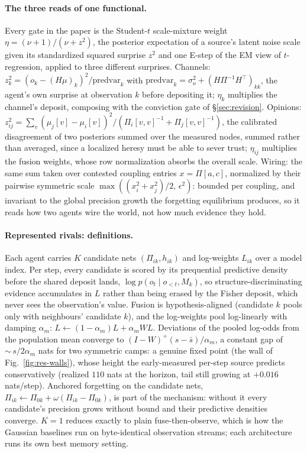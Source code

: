 \documentclass[runningheads]{llncs}
\begin{document}
\paragraph{The three reads of one functional.}
Every gate in the paper is the Student-$t$ scale-mixture weight
$\eta=(\nu+1)/(\nu+z^2)$, the posterior expectation of a source's latent noise scale given
its standardized squared surprise $z^2$ and one E-step of the EM view of $t$-regression, applied
to three different surprises. Channels: $z_k^2=(o_k-(H\mu)_k)^2/\mathrm{predvar}_k$ with
$\mathrm{predvar}_k=\sigma_o^2+(H\Pi^{-1}H^{\!\top})_{kk}$, the agent's own surprise at
observation $k$ before depositing it; $\eta_k$ multiplies the channel's deposit, composing
with the conviction gate of \S\ref{sec:revision}. Opinions:
$z_{ij}^2=\sum_v(\mu_j[v]-\mu_i[v])^2/(\Pi_i[v,v]^{-1}+\Pi_j[v,v]^{-1})$, the calibrated
disagreement of two posteriors summed over the measured nodes, summed rather than averaged,
since a localized heresy must be able to sever trust; $\eta_{ij}$ multiplies the fusion weights, whose row
normalization absorbs the overall scale. Wiring: the same sum taken over contested
coupling entries $x=\Pi[a,c]$, normalized by their pairwise symmetric scale
$\max((x_i^2+x_j^2)/2,\,\epsilon^2)$: bounded per coupling, and invariant to the global
precision growth the forgetting equilibrium produces, so it reads how two agents wire
the world, not how much evidence they hold.

\paragraph{Represented rivals: definitions.}
Each agent carries $K$ candidate nets $(\Pi_{ik},h_{ik})$ and log-weights $L_{ik}$ over a
model index. Per step, every candidate is scored by its prequential predictive density
before the shared deposit lands, $\log p(o_t\mid o_{<t},M_k)$, so
structure-discriminating evidence accumulates in $L$ rather than being erased by the Fisher
deposit, which never sees the observation's value. Fusion is hypothesis-aligned (candidate
$k$ pools only with neighbours' candidate $k$), and the log-weights pool log-linearly with
damping $\alpha_m$: $L\leftarrow(1-\alpha_m)L+\alpha_m WL$. Deviations of the pooled log-odds
from the population mean converge to $(I-W)^{+}(s-\bar s)/\alpha_m$, a constant gap of
${\sim}\,s/2\alpha_m$ nats for two symmetric camps: a genuine fixed point (the wall of
Fig.~\ref{fig:res-walls}), whose height the early-measured per-step source predicts
conservatively (realized $110$ nats at the horizon, tail still growing at $+0.016$ nats/step).
Anchored forgetting on the candidate nets,
$\Pi_{ik}\leftarrow\Pi_{0k}+\omega(\Pi_{ik}-\Pi_{0k})$, is part of the mechanism: without it
every candidate's precision grows without bound and their predictive densities converge. $K=1$
reduces exactly to plain fuse-then-observe, which is how the Gaussian baselines run on
byte-identical observation streams; each architecture runs its own best memory setting.
\end{document}
